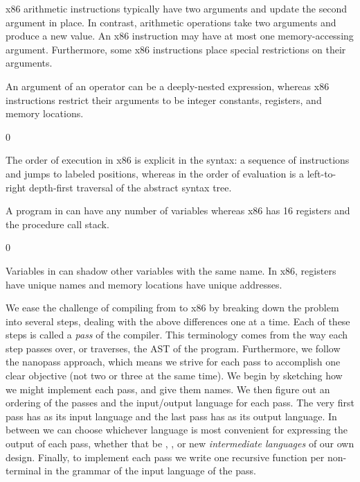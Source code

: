 \documentclass[7x10,nocrop]{TimesAPriori_MIT}%
\def\racketEd{0}
\def\edition{0}
\begin{document}
\begin{enumerate}
\item x86 arithmetic instructions typically have two arguments and
  update the second argument in place. In contrast, \LangVar{}
  arithmetic operations take two arguments and produce a new value.
  An x86 instruction may have at most one memory-accessing argument.
  Furthermore, some x86 instructions place special restrictions on
  their arguments.

\item An argument of an \LangVar{} operator can be a deeply-nested
  expression, whereas x86 instructions restrict their arguments to be
  integer constants, registers, and memory locations.

{\if\edition\racketEd      
\item The order of execution in x86 is explicit in the syntax: a
  sequence of instructions and jumps to labeled positions, whereas in
  \LangVar{} the order of evaluation is a left-to-right depth-first
  traversal of the abstract syntax tree.
\fi}

\item A program in \LangVar{} can have any number of variables
  whereas x86 has 16 registers and the procedure call stack.
{\if\edition\racketEd    
\item Variables in \LangVar{} can shadow other variables with the
  same name. In x86, registers have unique names and memory locations
  have unique addresses.
\fi}  
\end{enumerate}

We ease the challenge of compiling from \LangVar{} to x86 by breaking
down the problem into several steps, dealing with the above
differences one at a time. Each of these steps is called a \emph{pass}
of the compiler.
%
This terminology comes from the way each step passes over, or
traverses, the AST of the program.
%
Furthermore, we follow the nanopass approach, which means we strive
for each pass to accomplish one clear objective (not two or three at
the same time).
%
We begin by sketching how we might implement each pass, and give them
names.  We then figure out an ordering of the passes and the
input/output language for each pass. The very first pass has
\LangVar{} as its input language and the last pass has \LangXInt{} as
its output language. In between we can choose whichever language is
most convenient for expressing the output of each pass, whether that
be \LangVar{}, \LangXInt{}, or new \emph{intermediate languages} of
our own design.  Finally, to implement each pass we write one
recursive function per non-terminal in the grammar of the input
language of the pass.  
\end{document}

